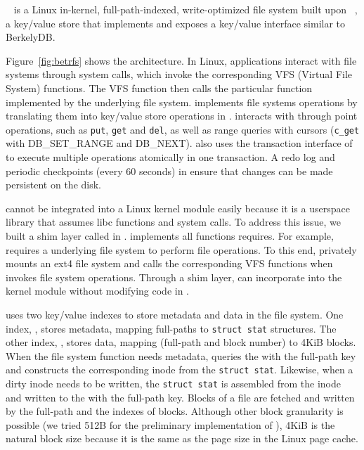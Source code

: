 \betrfs~\citep{betrfs1,betrfs1tos} is a Linux in-kernel, full-path-indexed,
write-optimized file system built upon \fti~\citep{fti},
a key/value store that implements \bets and
exposes a key/value interface similar to BerkelyDB.

Figure~\ref{fig:betrfs} shows the \betrfs architecture.
In Linux, applications interact with file systems through system calls,
which invoke the corresponding VFS (Virtual File System) functions.
The VFS function then calls the particular function implemented by
the underlying file system.
\betrfs implements file systems operations by translating them into key/value
store operations in \fti.
\betrfs interacts with \fti through point operations, such as \texttt{put},
\texttt{get} and \texttt{del}, as well as range queries with cursors
(\texttt{c\_get} with DB\_SET\_RANGE and DB\_NEXT).
\betrfs also uses the transaction interface of \fti to execute multiple
operations atomically in one transaction.
A redo log and periodic checkpoints (every 60 seconds) in \fti ensure that
changes can be made persistent on the disk.

\Fti cannot be integrated into a Linux kernel module easily because
it is a userspace library that assumes libc functions and system calls.
To address this issue, we built a shim layer called \klibc in \betrfs.
\Klibc implements all functions \fti requires.
For example, \fti requires a underlying file system to perform file operations.
To this end, \klibc privately mounts an ext4 file system and calls the
corresponding VFS functions when \fti invokes file system operations.
Through a shim layer, \betrfs can incorporate \fti into the kernel module
without modifying code in \fti.

\betrfs uses two key/value indexes to store metadata and data in the file
system.
One index, \mdb, stores metadata, mapping full-paths to \texttt{struct stat}
structures.
The other index, \ddb, stores data, mapping (full-path and block number) to
4KiB blocks.
When the file system function needs metadata, \betrfs queries
the \mdb with the full-path key and constructs the corresponding inode
from the \texttt{struct stat}.
Likewise, when a dirty inode needs to be written, the \texttt{struct stat} is
assembled from the inode and written to the \mdb with the
full-path key.
Blocks of a file are fetched and written by the full-path and the indexes of
blocks.
Although other block granularity is possible (we tried 512B for the preliminary
implementation of \betrfs), 4KiB is the natural block size
because it is the same as the page size in the Linux page cache.

